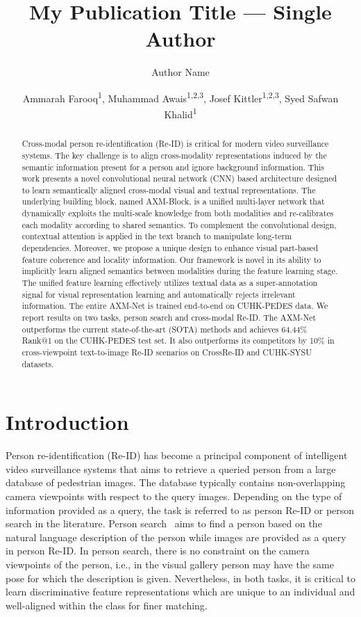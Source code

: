 \documentclass[letterpaper]{article} \usepackage{aaai22}  \usepackage{times}  \usepackage{helvet}  \usepackage{courier}  \usepackage[hyphens]{url}  \usepackage{graphicx} \urlstyle{rm} \def\UrlFont{\rm}  \usepackage{natbib}  \usepackage{caption} \DeclareCaptionStyle{ruled}{labelfont=normalfont,labelsep=colon,strut=off} \frenchspacing  \setlength{\pdfpagewidth}{8.5in}  \setlength{\pdfpageheight}{11in}  \usepackage{algorithm}
\title{\centering{AXM-Net: Implicit Cross-Modal Feature Alignment for Person Re-identification}}
\title{My Publication Title --- Single Author}
\author {
    Author Name
}
\author {
Ammarah Farooq\textsuperscript{\rm 1},
    Muhammad Awais\textsuperscript{\rm 1,2,3},
    Josef Kittler\textsuperscript{\rm 1,2,3},
    Syed Safwan Khalid\textsuperscript{\rm 1} 
}
\begin{document}
\maketitle

\begin{abstract}
Cross-modal person re-identification (Re-ID) is critical for modern video surveillance systems. The key challenge is to align cross-modality representations induced by the semantic information present for a person and ignore background information. This work presents a novel convolutional neural network (CNN) based architecture designed to learn semantically aligned cross-modal visual and textual representations. The underlying building block, named AXM-Block, is a unified multi-layer network that dynamically exploits the multi-scale knowledge from both modalities and re-calibrates each modality according to shared semantics. To complement the convolutional design, contextual attention is applied in the text branch to manipulate long-term dependencies. Moreover, we propose a unique design to enhance visual part-based feature coherence and locality information. Our framework is novel in its ability to implicitly learn aligned semantics between modalities during the feature learning stage. The unified feature learning effectively utilizes textual data as a super-annotation signal for visual representation learning and automatically rejects irrelevant information. The entire AXM-Net is trained end-to-end on CUHK-PEDES data. We report results on two tasks, person search and cross-modal Re-ID. The AXM-Net outperforms the current state-of-the-art (SOTA) methods and achieves 64.44\% Rank@1 on the CUHK-PEDES test set. It also outperforms its competitors by 10\% in cross-viewpoint text-to-image Re-ID scenarios on CrossRe-ID and CUHK-SYSU datasets.
\end{abstract}

\section{Introduction}
Person re-identification (Re-ID) has become a principal component of intelligent video surveillance systems that aims to retrieve a queried person from a large database of pedestrian images. The database typically contains non-overlapping camera viewpoints with respect to the query images. Depending on the type of information provided as a query, the task is referred to as person Re-ID or person search in the literature. Person search~\cite{li2017person} aims to find a person based on the natural language description of the person while images are provided as a query in person Re-ID. In person search, there is no constraint on the camera viewpoints of the person, i.e., in the visual gallery person may have the same pose for which the description is given. Nevertheless, in both tasks, it is critical to learn discriminative feature representations which are unique to an individual and well-aligned within the class for finer matching.  
 
\end{document}
